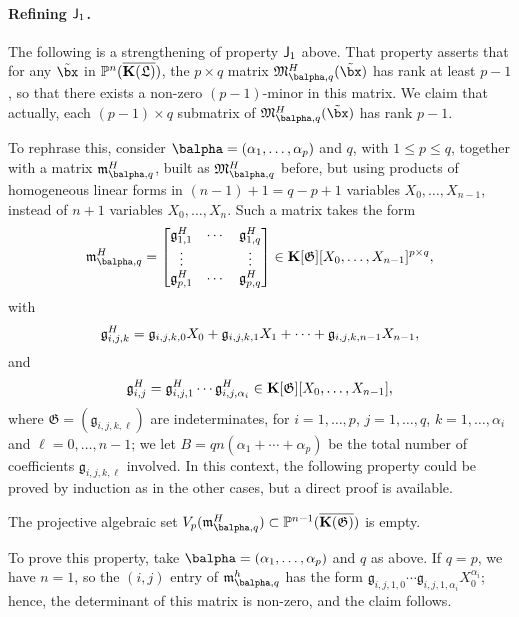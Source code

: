 \documentclass[12pt]{article}
\begin{document}
\paragraph{Refining $\mathsf{J}_1$.} The following  is a strengthening of 
property $\mathsf{J}_1$ above. That property asserts that for any
$\tilde\bx$ in $\mathbb{P}^n(\overline{\mathbf{K}(\mathfrak{L})})$, the $p \times q$ matrix
$\mathfrak{M}^H_{\balpha,q}(\tilde\bx)$ has rank at least $p-1$, so
that there exists a non-zero $(p-1)$-minor in this matrix.  We claim
that actually, each $(p-1)\times q$ submatrix of
$\mathfrak{M}^H_{\balpha,q}(\tilde\bx)$ has rank $p-1$.

To rephrase this, consider $\balpha=(\alpha_1,\dots,\alpha_p)$ and
$q$, with $1 \le p \le q$, together with a matrix
$\mathfrak{m}^H_{\balpha,q}$, built as $\mathfrak{M}^H_{\balpha,q}$
before, but using products of homogeneous linear forms in $(n-1)+1=q-p+1$
variables $X_0,\dots,X_{n-1}$, instead of $n+1$ variables
$X_0,\dots,X_n$. Such a matrix takes the form
\begin{align}\label{eq:matM2}
\mathfrak{m}^H_{\balpha,q}=\left [\begin{matrix}
\mathfrak{g}^H_{1,1} & \cdots & \mathfrak{g}^H_{1,q}\\
 \vdots & & \vdots\\
\mathfrak{g}^H_{p,1} & \cdots & \mathfrak{g}^H_{p,q}
  \end{matrix}\right ]\in \KK[\mathfrak{G}][X_0,\dots,X_{n-1}]^{p\times q},
\end{align}
with 
$$\mathfrak{g}^H_{i,j,k} = \frak{g}_{i,j,k,0}X_0 + \frak{g}_{i,j,k,1} X_1 +\cdots + \frak{g}_{i,j,k,n-1} X_{n-1},$$
and
$$\mathfrak{g}^H_{i,j} = \mathfrak{g}^H_{i,j,1} \cdots
\mathfrak{g}^H_{i,j,\alpha_i} \in \mathbf{K}[\mathfrak{G}][X_0,\dots,X_{n-1}],$$
where $\mathfrak{G}=(\mathfrak{g}_{i,j,k,\ell})$ are indeterminates,
for $i=1,\dots,p$, $j=1,\dots,q$, $k=1,\dots,\alpha_i$ and
$\ell=0,\dots,n-1$; we let $B=q n (\alpha_1+\cdots +\alpha_p)$ be the total
number of coefficients $\mathfrak{g}_{i,j,k,\ell}$ involved. In this context, the
following property could be proved by induction as in the other cases,
but a direct proof is available.

\begin{description}[leftmargin=*]
\item[$\assI_3(\balpha,q).$] The projective algebraic set
  $V_p(\mathfrak{m}^H_{\balpha,q}) \subset \P^{n-1}(\KKCbar)$ is empty.
\end{description}
To prove this property, take $\balpha=(\alpha_1,\dots,\alpha_p)$ and
$q$ as above. If $q=p$, we have $n=1$, so the $(i,j)$ entry of
$\mathfrak{m}^h_{\balpha,q}$ has the form
$\mathfrak{g}_{i,j,1,0}\cdots\mathfrak{g}_{i,j,1,\alpha_i}
X_0^{\alpha_i}$; hence, the determinant of this matrix is non-zero,
and the claim follows.
\end{document}
